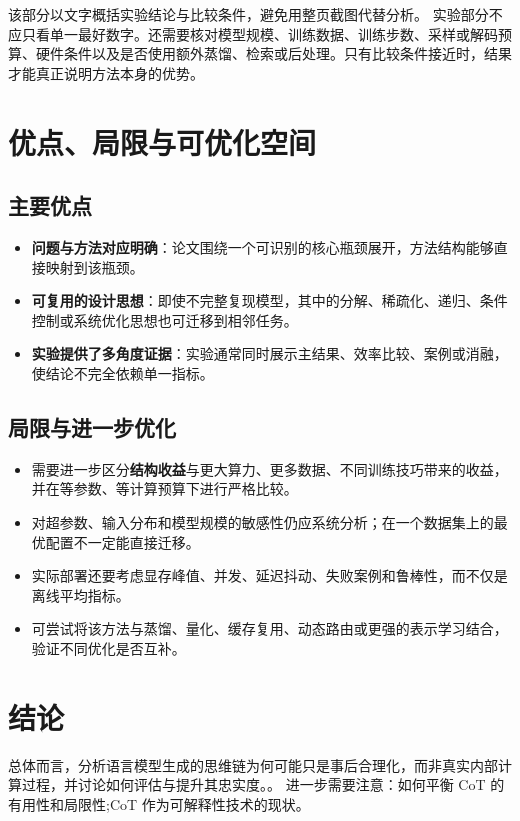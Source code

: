 \documentclass[UTF8,11pt,a4paper]{ctexart}
\newcommand{\term}[1]{\textbf{\textcolor{mainblue}{#1}}}
\begin{document}
该部分以文字概括实验结论与比较条件，避免用整页截图代替分析。
实验部分不应只看单一最好数字。还需要核对模型规模、训练数据、训练步数、采样或解码预算、硬件条件以及是否使用额外蒸馏、检索或后处理。只有比较条件接近时，结果才能真正说明方法本身的优势。

\section{优点、局限与可优化空间}
\subsection{主要优点}
\begin{itemize}
\item \term{问题与方法对应明确}：论文围绕一个可识别的核心瓶颈展开，方法结构能够直接映射到该瓶颈。
\item \term{可复用的设计思想}：即使不完整复现模型，其中的分解、稀疏化、递归、条件控制或系统优化思想也可迁移到相邻任务。
\item \term{实验提供了多角度证据}：实验通常同时展示主结果、效率比较、案例或消融，使结论不完全依赖单一指标。
\end{itemize}

\subsection{局限与进一步优化}
\begin{itemize}
\item 需要进一步区分\term{结构收益}与更大算力、更多数据、不同训练技巧带来的收益，并在等参数、等计算预算下进行严格比较。
\item 对超参数、输入分布和模型规模的敏感性仍应系统分析；在一个数据集上的最优配置不一定能直接迁移。
\item 实际部署还要考虑显存峰值、并发、延迟抖动、失败案例和鲁棒性，而不仅是离线平均指标。
\item 可尝试将该方法与蒸馏、量化、缓存复用、动态路由或更强的表示学习结合，验证不同优化是否互补。
\end{itemize}

\section{结论}
总体而言，分析语言模型生成的思维链为何可能只是事后合理化，而非真实内部计算过程，并讨论如何评估与提升其忠实度。。 进一步需要注意：如何平衡 CoT 的有用性和局限性;CoT 作为可解释性技术的现状。
\end{document}
